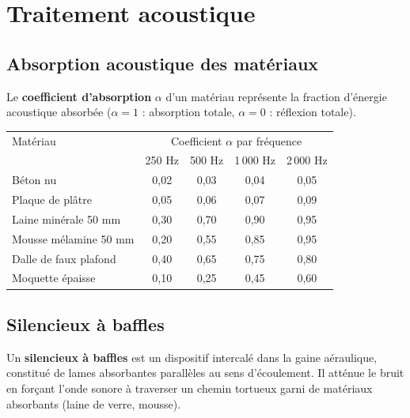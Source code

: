 \section{Traitement acoustique}

\subsection{Absorption acoustique des matériaux}

\begin{definition}
Le \textbf{coefficient d'absorption} $\alpha$ d'un matériau représente la fraction d'énergie acoustique absorbée ($\alpha = 1$ : absorption totale, $\alpha = 0$ : réflexion totale).

\begin{center}
\begin{tabular}{lcccc}
\toprule
Matériau & \multicolumn{4}{c}{Coefficient $\alpha$ par fréquence} \\
 & 250 Hz & 500 Hz & 1\,000 Hz & 2\,000 Hz \\
\midrule
Béton nu & 0,02 & 0,03 & 0,04 & 0,05 \\
Plaque de plâtre & 0,05 & 0,06 & 0,07 & 0,09 \\
Laine minérale 50 mm & 0,30 & 0,70 & 0,90 & 0,95 \\
Mousse mélamine 50 mm & 0,20 & 0,55 & 0,85 & 0,95 \\
Dalle de faux plafond & 0,40 & 0,65 & 0,75 & 0,80 \\
Moquette épaisse & 0,10 & 0,25 & 0,45 & 0,60 \\
\bottomrule
\end{tabular}
\end{center}
\end{definition}

\subsection{Silencieux à baffles}

\begin{definition}
Un \textbf{silencieux à baffles} est un dispositif intercalé dans la gaine aéraulique, constitué de lames absorbantes parallèles au sens d'écoulement. Il atténue le bruit en forçant l'onde sonore à traverser un chemin tortueux garni de matériaux absorbants (laine de verre, mousse).
\end{definition}

